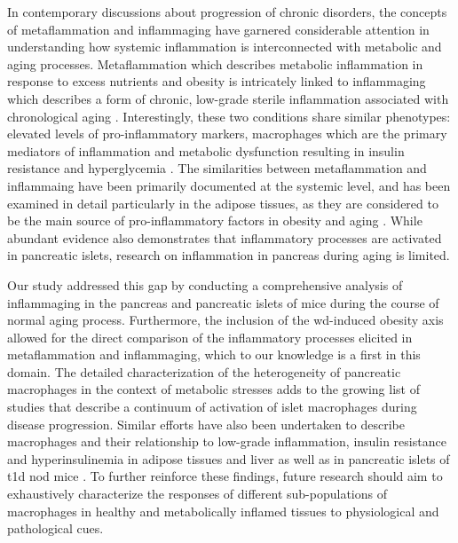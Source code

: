 \par In contemporary discussions about progression of chronic disorders, the concepts of metaflammation and inflammaging have garnered considerable attention in understanding how systemic inflammation is interconnected with metabolic and aging processes. Metaflammation which describes metabolic inflammation in response to excess nutrients and obesity is intricately linked to inflammaging which describes a form of chronic, low-grade sterile inflammation associated with chronological aging \textbf{\cite{}}. Interestingly, these two conditions share similar phenotypes: elevated levels of pro-inflammatory markers, macrophages which are the primary mediators of inflammation and metabolic dysfunction resulting in insulin resistance and hyperglycemia \textbf{\cite{https://doi.org/10.1016/j.arr.2017.10.003}}. The similarities between metaflammation and inflammaing have been primarily documented at the systemic level, and has been examined in detail particularly in the adipose tissues, as they are considered to be the main source of pro-inflammatory factors in obesity and aging \textbf{\cite{hotamisligil_inflammation_2017,https://doi.org/10.1016/j.arr.2017.10.003}}. While abundant evidence also demonstrates that inflammatory processes are activated in pancreatic islets, research on inflammation in pancreas during aging is limited.
\clearpage
\par Our study addressed this gap by conducting a comprehensive analysis of inflammaging in the pancreas and pancreatic islets of mice during the course of normal aging process. Furthermore, the inclusion of the \acrfull{wd}-induced obesity axis allowed for the direct comparison of the inflammatory processes elicited in metaflammation and inflammaging, which to our knowledge is a first in this domain. The detailed characterization of the heterogeneity of pancreatic macrophages in the context of metabolic stresses adds to the growing list of studies that describe a continuum of activation of islet macrophages during disease progression. Similar efforts have also been undertaken to describe macrophages and their relationship to low-grade inflammation, insulin resistance and hyperinsulinemia in adipose tissues and liver as well as in pancreatic islets of \gls{t1d} \gls{nod} mice \textbf{\cite{zakharov_single-cell_2020}}. To further reinforce these findings, future research should aim to exhaustively characterize the responses of different sub-populations of macrophages in healthy and metabolically inflamed tissues to physiological and pathological cues.\\

